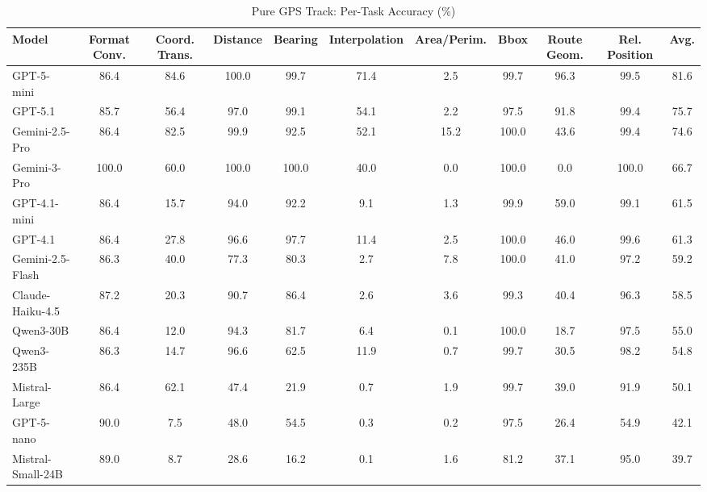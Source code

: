 \begin{table}[t]
\centering
\caption{Pure GPS Track: Per-Task Accuracy (\%)}
\label{tab:pure_gps_results}
\small
\begin{tabular}{lcccccccccc}
\toprule
Model & Format Conv. & Coord. Trans. & Distance & Bearing & Interpolation & Area/Perim. & Bbox & Route Geom. & Rel. Position & Avg. \\
\midrule
GPT-5-mini & 86.4 & 84.6 & 100.0 & 99.7 & 71.4 & 2.5 & 99.7 & 96.3 & 99.5 & 81.6 \\
GPT-5.1 & 85.7 & 56.4 & 97.0 & 99.1 & 54.1 & 2.2 & 97.5 & 91.8 & 99.4 & 75.7 \\
Gemini-2.5-Pro & 86.4 & 82.5 & 99.9 & 92.5 & 52.1 & 15.2 & 100.0 & 43.6 & 99.4 & 74.6 \\
Gemini-3-Pro & 100.0 & 60.0 & 100.0 & 100.0 & 40.0 & 0.0 & 100.0 & 0.0 & 100.0 & 66.7 \\
GPT-4.1-mini & 86.4 & 15.7 & 94.0 & 92.2 & 9.1 & 1.3 & 99.9 & 59.0 & 99.1 & 61.5 \\
GPT-4.1 & 86.4 & 27.8 & 96.6 & 97.7 & 11.4 & 2.5 & 100.0 & 46.0 & 99.6 & 61.3 \\
Gemini-2.5-Flash & 86.3 & 40.0 & 77.3 & 80.3 & 2.7 & 7.8 & 100.0 & 41.0 & 97.2 & 59.2 \\
Claude-Haiku-4.5 & 87.2 & 20.3 & 90.7 & 86.4 & 2.6 & 3.6 & 99.3 & 40.4 & 96.3 & 58.5 \\
Qwen3-30B & 86.4 & 12.0 & 94.3 & 81.7 & 6.4 & 0.1 & 100.0 & 18.7 & 97.5 & 55.0 \\
Qwen3-235B & 86.3 & 14.7 & 96.6 & 62.5 & 11.9 & 0.7 & 99.7 & 30.5 & 98.2 & 54.8 \\
Mistral-Large & 86.4 & 62.1 & 47.4 & 21.9 & 0.7 & 1.9 & 99.7 & 39.0 & 91.9 & 50.1 \\
GPT-5-nano & 90.0 & 7.5 & 48.0 & 54.5 & 0.3 & 0.2 & 97.5 & 26.4 & 54.9 & 42.1 \\
Mistral-Small-24B & 89.0 & 8.7 & 28.6 & 16.2 & 0.1 & 1.6 & 81.2 & 37.1 & 95.0 & 39.7 \\
\bottomrule
\end{tabular}
\end{table}